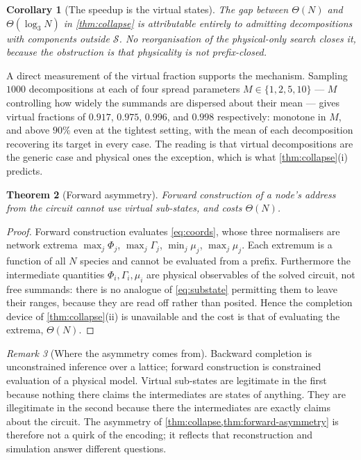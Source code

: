 \documentclass[11pt,twocolumn,a4paper]{article}
\theoremstyle{plain}
\newtheorem{theorem}{Theorem}[section]
\newtheorem{corollary}[theorem]{Corollary}
\theoremstyle{definition}
\theoremstyle{remark}
\newtheorem{remark}[theorem]{Remark}
\newcommand{\Sspace}{\mathcal{S}}
\begin{document}
\begin{corollary}[The speedup is the virtual states]
\label{cor:speedup}
The gap between $\Theta(N)$ and $\Theta(\log_3 N)$ in \cref{thm:collapse} is
attributable entirely to admitting decompositions with components outside
$\Sspace$. No reorganisation of the physical-only search closes it, because the
obstruction is that physicality is not prefix-closed.
\end{corollary}

A direct measurement of the virtual fraction supports the mechanism. Sampling
$1000$ decompositions at each of four spread parameters
$M \in \{1,2,5,10\}$ --- $M$ controlling how widely the summands are dispersed
about their mean --- gives virtual fractions of $0.917$, $0.975$, $0.996$, and
$0.998$ respectively: monotone in $M$, and above $90\%$ even at the tightest
setting, with the mean of each decomposition recovering its target in every
case. The reading is that virtual decompositions are the generic case and
physical ones the exception, which is what \cref{thm:collapse}(i) predicts.

\begin{theorem}[Forward asymmetry]
\label{thm:forward-asymmetry}
Forward construction of a node's address from the circuit cannot use virtual
sub-states, and costs $\Theta(N)$.
\end{theorem}

\begin{proof}
Forward construction evaluates \cref{eq:coords}, whose three normalisers are
network extrema $\max_j\Phi_j$, $\max_j\Gamma_j$, $\min_j\mu_j$, $\max_j\mu_j$.
Each extremum is a function of all $N$ species and cannot be evaluated from a
prefix. Furthermore the intermediate quantities $\Phi_i,\Gamma_i,\mu_i$ are
physical observables of the solved circuit, not free summands: there is no
analogue of \cref{eq:substate} permitting them to leave their ranges, because
they are read off  rather than posited. Hence the
completion device of \cref{thm:collapse}(ii) is unavailable and the cost is that
of evaluating the extrema, $\Theta(N)$.
\end{proof}

\begin{remark}[Where the asymmetry comes from]
Backward completion is unconstrained inference over a lattice; forward
construction is constrained evaluation of a physical model. Virtual sub-states
are legitimate in the first because nothing there claims the intermediates are
states of anything. They are illegitimate in the second because there the
intermediates are exactly claims about the circuit. The asymmetry of
\cref{thm:collapse,thm:forward-asymmetry} is therefore not a quirk of the
encoding; it reflects that reconstruction and simulation answer different
questions.
\end{remark}
\end{document}
